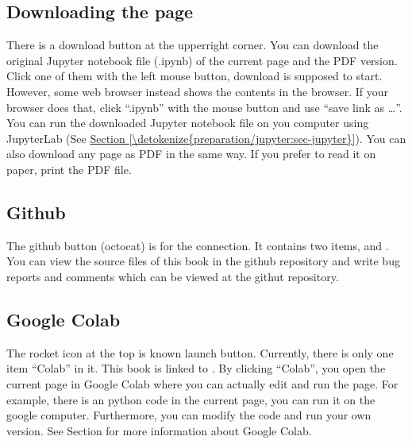 \documentclass[letterpaper,10pt,english]{jupyterBook}
\begin{document}
\subsection{Downloading the page}
\label{\detokenize{preparation/thisbook:downloading-the-page}}
\sphinxAtStartPar
There is a download button at the upper\sphinxhyphen{}right corner.  You can download the original Jupyter notebook file (.ipynb) of the current page and the PDF version.  Click one of them with the left mouse button, download is supposed to start.  However, some web browser instead shows the contents in the browser.  If your browser does that, click “.ipynb” with the  mouse button and use “save link as …”. You can run the downloaded Jupyter notebook file on you computer using JupyterLab (See \hyperref[\detokenize{preparation/jupyter:sec-jupyter}]{Section \ref{\detokenize{preparation/jupyter:sec-jupyter}}}).
You can also download any page as PDF in the same way.  If you prefer to read it on paper, print the PDF file.


\subsection{Github}
\label{\detokenize{preparation/thisbook:github}}
\sphinxAtStartPar
The github button (octocat) is for the  connection.  It contains two items,  and .   You can view the source files of this book in the github repository and write bug reports and comments which can be viewed at the githut repository.


\subsection{Google Colab}
\label{\detokenize{preparation/thisbook:google-colab}}
\sphinxAtStartPar
The rocket icon at the top is known launch button.  Currently, there is only one item “Colab” in it.  This book is linked to .  By clicking “Colab”, you open the current page in Google Colab where you can actually edit and run the page.  For example, there is an python code in the current page, you can run it on the google computer.   Furthermore, you can modify the code and run your own version.  See Section {\hyperref[\detokenize{preparation/cloud:sec-colab}]{}} for more information about Google Colab.
\end{document}
